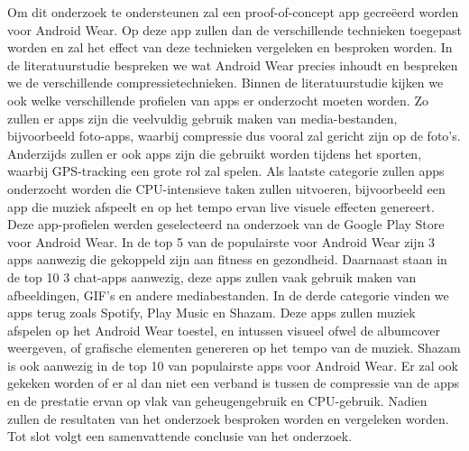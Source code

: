 



Om dit onderzoek te ondersteunen zal een proof-of-concept app gecreëerd worden voor Android Wear. Op deze app zullen dan de verschillende technieken toegepast worden en zal het effect van deze technieken vergeleken en besproken worden. In de literatuurstudie bespreken we wat Android Wear precies inhoudt en bespreken we de verschillende compressietechnieken. Binnen de literatuurstudie kijken we ook welke verschillende profielen van apps er onderzocht moeten worden. Zo zullen er apps zijn die veelvuldig gebruik maken van media-bestanden, bijvoorbeeld foto-apps, waarbij compressie dus vooral zal gericht zijn op de foto's. Anderzijds zullen er ook apps zijn die gebruikt worden tijdens het sporten, waarbij GPS-tracking een grote rol zal spelen. Als laatste categorie zullen apps onderzocht worden die CPU-intensieve taken zullen uitvoeren, bijvoorbeeld een app die muziek afspeelt en op het tempo ervan live visuele effecten genereert. Deze app-profielen werden geselecteerd na onderzoek van de Google Play Store voor Android Wear. In de top 5 van de populairste voor Android Wear zijn 3 apps aanwezig die gekoppeld zijn aan fitness en gezondheid. Daarnaast staan in de top 10 3 chat-apps aanwezig, deze apps zullen vaak gebruik maken van afbeeldingen, GIF's en andere mediabestanden. In de derde categorie vinden we apps terug zoals Spotify, Play Music en Shazam. Deze apps zullen muziek afspelen op het Android Wear toestel, en intussen visueel ofwel de albumcover weergeven, of grafische elementen genereren op het tempo van de muziek. Shazam is ook aanwezig in de top 10 van populairste apps voor Android Wear. Er zal ook gekeken worden of er al dan niet een verband is tussen de compressie van de apps en de prestatie ervan op vlak van geheugengebruik en CPU-gebruik. Nadien zullen de resultaten van het onderzoek besproken worden en vergeleken worden. Tot slot volgt een samenvattende conclusie van het onderzoek. 


